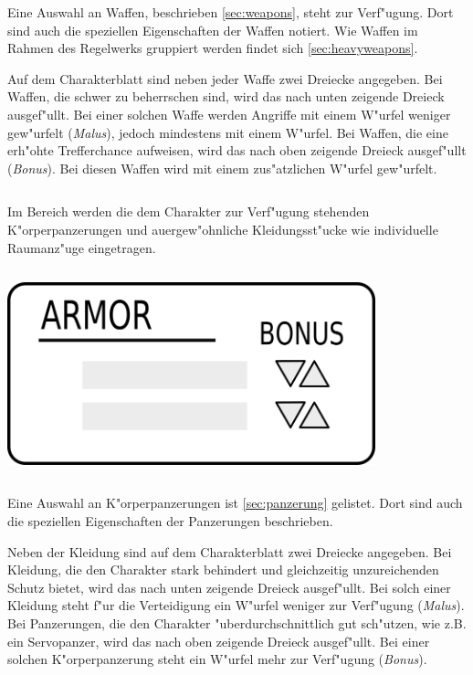 Eine Auswahl an Waffen, beschrieben \cref{sec:weapons}, steht zur Verf"ugung. Dort sind auch die speziellen Eigenschaften der Waffen notiert. Wie Waffen im Rahmen des Regelwerks gruppiert werden findet sich \cref{sec:heavyweapons}.

Auf dem Charakterblatt sind neben jeder Waffe zwei Dreiecke angegeben. Bei Waffen, die schwer zu beherrschen sind, wird das nach unten zeigende Dreieck ausgef"ullt. Bei einer solchen Waffe werden Angriffe mit einem W"urfel weniger gew"urfelt (\emph{Malus}), jedoch mindestens mit einem W"urfel. Bei Waffen, die eine erh"ohte Trefferchance aufweisen, wird das nach oben zeigende Dreieck ausgef"ullt (\emph{Bonus}). Bei diesen Waffen wird mit einem zus"atzlichen W"urfel gew"urfelt.

\begin{column}[l]{0.55}
    Im Bereich  werden die dem Charakter zur Verf"ugung stehenden K"orperpanzerungen und au\3ergew"ohnliche Kleidungsst"ucke wie individuelle Raumanz"uge eingetragen.
\end{column}
\begin{column}[r]{0.45}
    \centering
    \includegraphics[width=0.80\textwidth]{images/character_armor.png}
\end{column}
\medskip

Eine Auswahl an K"orperpanzerungen ist \cref{sec:panzerung} gelistet. Dort sind auch die speziellen Eigenschaften der Panzerungen beschrieben.

Neben der Kleidung sind auf dem Charakterblatt zwei Dreiecke angegeben. Bei Kleidung, die den Charakter stark behindert und gleichzeitig unzureichenden Schutz bietet, wird das nach unten zeigende Dreieck ausgef"ullt. Bei solch einer Kleidung steht f"ur die Verteidigung ein W"urfel weniger zur Verf"ugung (\emph{Malus}). Bei Panzerungen, die den Charakter "uberdurchschnittlich gut sch"utzen, wie z.B. ein Servopanzer, wird das nach oben zeigende Dreieck ausgef"ullt. Bei einer solchen K"orperpanzerung steht ein W"urfel mehr zur Verf"ugung (\emph{Bonus}).

